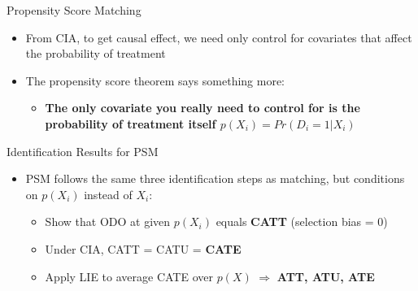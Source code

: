 \documentclass[dvipsnames,hyperref={pdfpagelabels=false}]{beamer}
\begin{document}
\begin{frame}{Propensity Score Matching}
	\begin{itemize}
		\item From CIA, to get causal effect, we need only control for covariates that affect the probability of treatment
		\vspace{0.2cm}
		\item The propensity score theorem says something more: 
				\vspace{0.2cm}
			\begin{itemize}
		\item \textbf{The only covariate you really need to control for is the probability of treatment itself $p(X_{i}) = Pr(D_{i}=1|X_{i}) $}
			\end{itemize}
	\end{itemize}
\end{frame}



\begin{frame}{Identification Results for PSM}
	\begin{itemize}
		\item PSM follows the same three identification steps as matching, but conditions on $p(X_i)$ instead of $X_i$:
		\vspace{0.3cm}
		\begin{itemize}
			\item[\textbf{Step 1}] Show that ODO at given $p(X_i)$ equals \textbf{CATT} (selection bias = 0)
			\vspace{0.2cm}
			\item[\textbf{Step 2}] Under CIA, CATT = CATU = \textbf{CATE}
			\vspace{0.2cm}
			\item[\textbf{Step 3}] Apply LIE to average CATE over $p(X)$ $\Rightarrow$ \textbf{ATT, ATU, ATE}
		\end{itemize}
	\end{itemize}
\end{frame}


\end{document}
